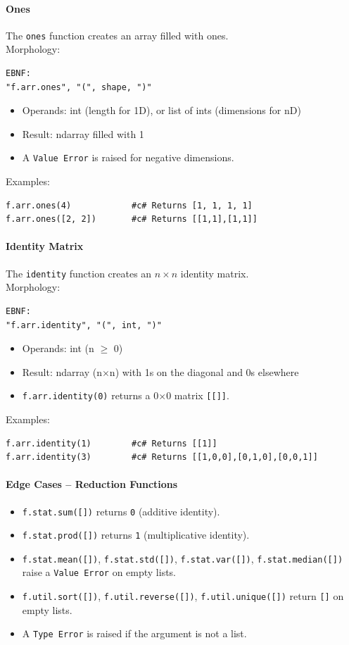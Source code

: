 \paragraph{Ones}
The \texttt{ones} function creates an array filled with ones.\\
Morphology:
\begin{verbatim}
EBNF:
"f.arr.ones", "(", shape, ")"
\end{verbatim}
\begin{itemize}
\item Operands: int (length for 1D), or list of ints (dimensions for nD)
\item Result: ndarray filled with 1
\item A \texttt{Value Error} is raised for negative dimensions.
\end{itemize}
Examples:
\begin{verbatim}
f.arr.ones(4)            #c# Returns [1, 1, 1, 1]
f.arr.ones([2, 2])       #c# Returns [[1,1],[1,1]]
\end{verbatim}

\paragraph{Identity Matrix}
The \texttt{identity} function creates an $n \times n$ identity matrix.\\
Morphology:
\begin{verbatim}
EBNF:
"f.arr.identity", "(", int, ")"
\end{verbatim}
\begin{itemize}
\item Operands: int (n $\geq$ 0)
\item Result: ndarray (n$\times$n) with 1s on the diagonal and 0s elsewhere
\item \texttt{f.arr.identity(0)} returns a 0$\times$0 matrix \texttt{[[]]}.
\end{itemize}
Examples:
\begin{verbatim}
f.arr.identity(1)        #c# Returns [[1]]
f.arr.identity(3)        #c# Returns [[1,0,0],[0,1,0],[0,0,1]]
\end{verbatim}

\paragraph{Edge Cases -- Reduction Functions}
\begin{itemize}
\item \texttt{f.stat.sum([])} returns \texttt{0} (additive identity).
\item \texttt{f.stat.prod([])} returns \texttt{1} (multiplicative identity).
\item \texttt{f.stat.mean([])}, \texttt{f.stat.std([])}, \texttt{f.stat.var([])}, \texttt{f.stat.median([])} raise a \texttt{Value Error} on empty lists.
\item \texttt{f.util.sort([])}, \texttt{f.util.reverse([])}, \texttt{f.util.unique([])} return \texttt{[]} on empty lists.
\item A \texttt{Type Error} is raised if the argument is not a list.
\end{itemize}

